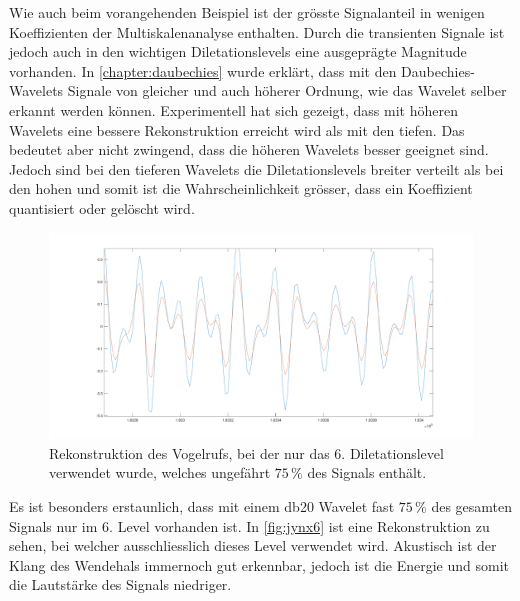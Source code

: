 \begin{refsection}
Wie auch beim vorangehenden Beispiel ist der grösste Signalanteil in wenigen Koeffizienten der Multiskalenanalyse enthalten.
Durch die transienten Signale ist jedoch auch in den wichtigen Diletationslevels eine ausgeprägte Magnitude vorhanden.
In \autoref{chapter:daubechies} wurde erklärt, dass mit den Daubechies-Wavelets Signale von gleicher und auch höherer Ordnung, wie das Wavelet selber erkannt werden können. 
Experimentell hat sich gezeigt, dass mit höheren Wavelets eine bessere Rekonstruktion erreicht wird als mit den tiefen.
Das bedeutet aber nicht zwingend, dass die höheren Wavelets besser geeignet sind.
Jedoch sind bei den tieferen Wavelets die Diletationslevels breiter verteilt als bei den hohen und somit ist die Wahrscheinlichkeit grösser, dass ein Koeffizient quantisiert oder gelöscht wird. 
\begin{figure}
	\centering
	\includegraphics[width=\linewidth]{papers/compress/Bilder/jynxNear.pdf}
	\caption{Rekonstruktion des Vogelrufs, bei der nur das 6. Diletationslevel verwendet wurde, welches ungefährt $75\,\textbf{\%}$ des Signals enthält.}
	\label{fig:jynx6}
\end{figure}
Es ist besonders erstaunlich, dass mit einem db20 Wavelet fast $75\,\text{\%}$ des gesamten Signals nur im 6. Level vorhanden ist.
In \autoref{fig:jynx6} ist eine Rekonstruktion zu sehen, bei welcher ausschliesslich dieses Level verwendet wird.
Akustisch ist der Klang des Wendehals immernoch gut erkennbar, jedoch ist die Energie und somit die Lautstärke des Signals niedriger.


\end{refsection}
